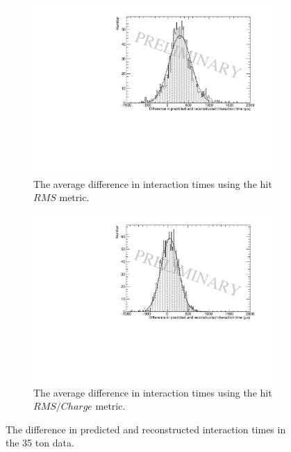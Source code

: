 \begin{figure}[h!]
  \centering
  \begin{subfigure}{0.45\textwidth}
    \centering
    \includegraphics[width=\textwidth]{Data_AvTimeDiff_RMS}
    \caption{The average difference in interaction times using the hit $RMS$ metric.}
  \end{subfigure}
  \hspace{0.08\textwidth}
  \begin{subfigure}{0.45\textwidth}
    \centering
    \includegraphics[width=\textwidth]{Data_AvTimeDiff_RMS_Int}
    \caption{The average difference in interaction times using the hit $RMS/Charge$ metric.}
  \end{subfigure}
  \caption[The difference in predicted and reconstructed interaction times in the 35 ton data]
          {The difference in predicted and reconstructed interaction times in the 35 ton data.}
          \label{fig:DiffDataAvDiff}
\end{figure}

